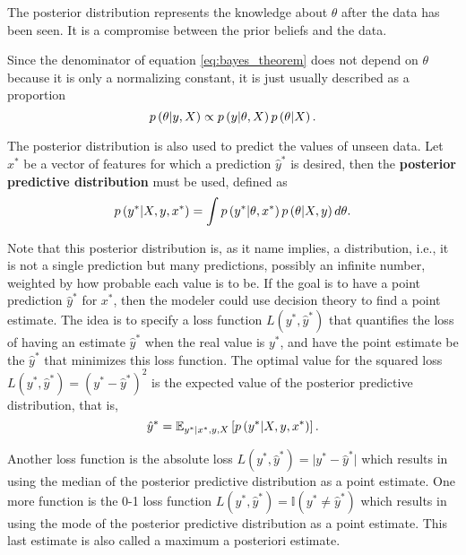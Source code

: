 The posterior distribution represents the knowledge about $\theta$ after the data has been seen. It is a compromise between the prior beliefs and the data. %

Since the denominator of equation \eqref{eq:bayes_theorem} does not depend on $\theta$ because it is only a normalizing constant, it is just usually described as a proportion
\begin{equation}
  \label{eq:bayes_theorem_prop}
    p\left( \theta | y, X \right) \propto p\left( y | \theta, X \right) p\left( \theta | X \right).
\end{equation}

The posterior distribution is also used to predict the values of unseen data. Let $x^*$ be a vector of features for which a prediction $\hat{y}^*$ is desired, then the \textbf{posterior predictive distribution} must be used, defined as
\begin{equation}
  \label{eq:post_pred_dist}
  p\left( y^* | X, y, x^* \right) = \int p\left( y^* | \theta, x^* \right) p\left( \theta | X, y \right) d\theta.
\end{equation}

Note that this posterior distribution is, as it name implies, a distribution, i.e., it is not a single prediction but many predictions, possibly an infinite number, weighted by how probable each value is to be. If the goal is to have a point prediction $\hat{y}^*$ for $x^*$, then the modeler could use decision theory to find a point estimate. The idea is to specify a loss function $L(y^*, \hat{y}^*)$ that quantifies the loss of having an estimate $\hat{y}^*$ when the real value is $y^*$, and have the point estimate be the $\hat{y}^*$ that minimizes this loss function. The optimal value for the squared loss $L(y^*, \hat{y}^*) = (y^* - \hat{y}^*)^2$ is the expected value of the posterior predictive distribution, that is,
\begin{equation}
  \hat{y}^* = \mathbb{E}_{y^* | x^*, y, X} \left[ p\left( y^* | X, y, x^* \right) \right].
\end{equation}

Another loss function is the absolute loss $L(y^*, \hat{y}^*) = \vert y^* - \hat{y}^* \vert$ which results in using the median of the posterior predictive distribution as a point estimate. One more function is the 0-1 loss function $L(y^*, \hat{y}^*) = \mathbb{I}(y^* \neq \hat{y}^* )$ which results in using the mode of the posterior predictive distribution as a point estimate. This last estimate is also called a maximum a posteriori estimate.

